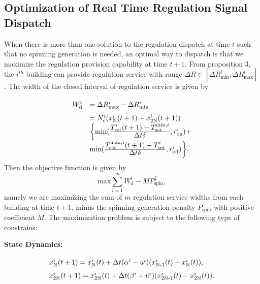 \documentclass[journal]{IEEEtran}
\begin{document}
\subsection{Optimization of Real Time Regulation Signal Dispatch}
When there is more than one solution to the regulation dispatch at time $t$ such that no spinning generation is needed, an optimal way to dispatch is that we maximize the regulation provision capability at time $t+1$. From proposition 3, the $i^{th}$ building can provide regulation service with range $\Delta R \in [\Delta R_{\textrm{min}}^{i},\Delta R_{\textrm{max}}^{i}]$. The width of the closed interval of regulation service is given by
\begin{equation}
\setlength{\extrarowheight}{7pt}
\begin{array}{ll}
W_{\textrm{d}}^{i}&=\Delta R_{\textrm{max}}^{i}-\Delta R_{\textrm{min}}^{i}\\
&=N_{\textrm{c}}^{i}(x_{\textrm{N}}^{i}(t+1)+x_{\textrm{2N}}^{i}(t+1))\\
&\biggl\{\min(\frac{\displaystyle
T_{\textrm{set}}^{i}(t+1)-T^{\textrm{min},i}_{\textrm{set}}}{\displaystyle
\Delta t \delta},r_{\textrm{on}}^{i})+\\
&\min(\frac{\displaystyle
T^{\textrm{max},i}_{\textrm{set}}(t+1)-T_{\textrm{set}}^{i}}{\displaystyle
\Delta t \delta},r_{\textrm{off}}^{i})\biggr\}.
\end{array}
\end{equation}
Then the objective function is given by
\begin{equation}
\textrm{max} \sum\limits_{i=1}^{m} W_{\textrm{d}}^{i} - M P_{\textrm{spin}}^{2},
\end{equation}
namely we are maximizing the sum of $m$ regulation service widths from each building at time $t+1$, minus the spinning generation penalty $P_{\textrm{spin}}$ with positive coefficient $M$. The maximization problem is subject to the following type of constrains:

\textbf{State Dynamics:}
\begin{equation}
\label{constraint:state dynamics}
\setlength{\extrarowheight}{7pt}
\begin{array}{l}
x_{\textrm{N}}^{i}(t+1)=x_{\textrm{N}}^{i}(t)+\Delta t (\alpha^{i}-u^{i})(x_{\textrm{N-1}}^{i}(t)-x_{\textrm{N}}^{i}(t)),\\
x_{\textrm{2N}}^{i}(t+1)=x_{\textrm{2N}}^{i}(t)+\Delta t (\beta^{i}+u^{i})(x_{\textrm{2N-1}}^{i}(t)-x_{\textrm{2N}}^{i}(t)).
\end{array}
\end{equation}
\end{document}

